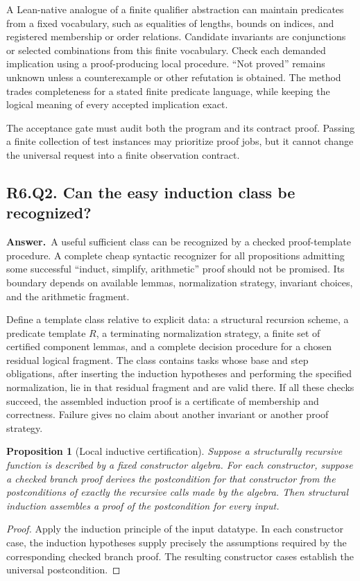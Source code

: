 \documentclass[11pt,a4paper]{article}
\newtheorem{proposition}[theorem]{Proposition}
\theoremstyle{definition}
\theoremstyle{remark}
\newcommand{\answer}{\par\noindent\textbf{Answer.}\ }
\newcommand{\qheading}[2]{\subsection{#1. #2}}
\begin{document}
A Lean-native analogue of a finite qualifier abstraction can maintain predicates
from a fixed vocabulary, such as equalities of lengths, bounds on indices, and
registered membership or order relations. Candidate invariants are conjunctions
or selected combinations from this finite vocabulary. Check each demanded
implication using a proof-producing local procedure. ``Not proved'' remains
unknown unless a counterexample or other refutation is obtained. The method
trades completeness for a stated finite predicate language, while keeping the
logical meaning of every accepted implication exact.

The acceptance gate must audit both the program and its contract proof. Passing
a finite collection of test instances may prioritize proof jobs, but it cannot
change the universal request into a finite observation contract.

\qheading{R6.Q2}{Can the easy induction class be recognized?}
\answer A useful sufficient class can be recognized by a checked proof-template
procedure. A complete cheap syntactic recognizer for all propositions admitting
some successful ``induct, simplify, arithmetic'' proof should not be promised.
Its boundary depends on available lemmas, normalization strategy, invariant
choices, and the arithmetic fragment.

Define a template class relative to explicit data: a structural recursion
scheme, a predicate template $R$, a terminating normalization strategy, a finite
set of certified component lemmas, and a complete decision procedure for a
chosen residual logical fragment. The class contains tasks whose base and
step obligations, after inserting the induction hypotheses and performing the
specified normalization, lie in that residual fragment and are valid there.
If all these checks succeed, the assembled induction proof is a certificate of
membership and correctness. Failure gives no claim about another invariant or
another proof strategy.

\begin{proposition}[Local inductive certification]
Suppose a structurally recursive function is described by a fixed constructor
algebra. For each constructor, suppose a checked branch proof derives the
postcondition for that constructor from the postconditions of exactly the
recursive calls made by the algebra. Then structural induction assembles a
proof of the postcondition for every input.
\end{proposition}
\begin{proof}
Apply the induction principle of the input datatype. In each constructor case,
the induction hypotheses supply precisely the assumptions required by the
corresponding checked branch proof. The resulting constructor cases establish
the universal postcondition.
\end{proof}
\end{document}
